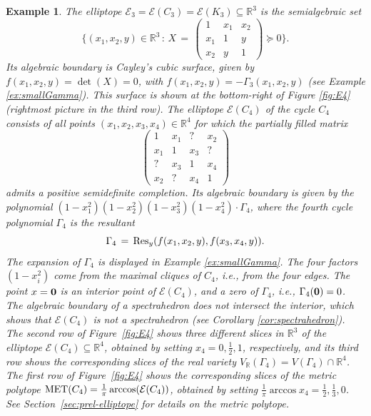 \documentclass[a4paper, 11pt, twoside]{article}
\newcommand{\R}{\mathbb{R}}
\newcommand{\ME}{{\mathcal E}}
\newcommand{\MET}{\text{\rm MET}}
\theoremstyle{plain}
\newtheorem{example}[theorem]{Example}
\begin{document}
\begin{example} \label{ex:intro}
The elliptope $\ME_3 = \ME(C_3) = \ME(K_3) \subseteq \mathbb{R}^3$ is the semialgebraic set 
\[ \Big \{ (x_1,x_2,y) \in \mathbb{R}^3 \, : \, X\, = \,  \left ( \begin{smallmatrix} 1 & x_1 & x_2 \\ x_1 & 1 & y \\ x_2 & y & 1 \end{smallmatrix} \right ) \succeq 0 \Big \}. \]
Its algebraic boundary is Cayley's cubic surface, given by $f(x_1,x_2,y) = \det (X) = 0$, with $f(x_1,x_2,y)=-\Gamma_3(x_1,x_2,y)$ (see Example \ref{ex:smallGamma}). 
This surface is shown at the bottom-right of Figure \ref{fig:E4} (rightmost picture in the third row).
The elliptope $\ME(C_4)$ of the cycle $C_4$ consists of all points $(x_1,x_2,x_3,x_4) \in \mathbb{R}^4$ for which the partially filled matrix 
\[ \left ( \begin{smallmatrix}
1 & x_1 & ? & x_2 \\ 
x_1 & 1 & x_3 & ? \\ 
? & x_3 & 1 & x_4 \\ 
x_2 & ? & x_4 & 1
\end{smallmatrix} \right ) \]
admits a positive semidefinite completion. Its algebraic boundary is given by the polynomial $(1-x_1^2)(1-x_2^2)(1-x_3^2)(1-x_4^2) \cdot \Gamma_4$, where the fourth cycle polynomial $\Gamma_4$ is the resultant 
\[ \Gamma_4 \, = \, {\rm Res}_y(f(x_1,x_2,y),f(x_3,x_4,y)). \]
The expansion of $\Gamma_4$ is displayed in Example \ref{ex:smallGamma}. The four factors $(1-x_i^2)$ come from the maximal cliques of $C_4$, i.e., from the four edges. 
The point $x = {\bf 0}$ is an interior point of $\ME(C_4)$, and a zero of $\Gamma_4$,  i.e.,  $\Gamma_4({\bf 0}) = 0$. The algebraic boundary of a spectrahedron does not intersect the interior, which shows that $\ME(C_4)$ is not a spectrahedron (see Corollary \ref{cor:spectrahedron}). The second row of Figure~\ref{fig:E4} shows three different slices in $\R^3$ of the elliptope $\ME(C_4)\subseteq \R^4$, obtained by setting $x_4=0,\tfrac{1}{2},1$, respectively, and its third row shows   the corresponding slices of the real variety 
$V_\R(\Gamma_4)=V(\Gamma_4)\cap\R^4$. The first row of Figure~\ref{fig:E4} shows the corresponding slices of the metric polytope $\MET(C_4)=\tfrac{1}{\pi}\arccos(\ME(C_4))$, obtained by setting $\tfrac{1}{\pi}\arccos x_4=\tfrac{1}{2},\tfrac{1}{3},0$. See Section~\ref{sec:prel-elliptope} for details on the metric polytope.
\end{example}
\end{document}
